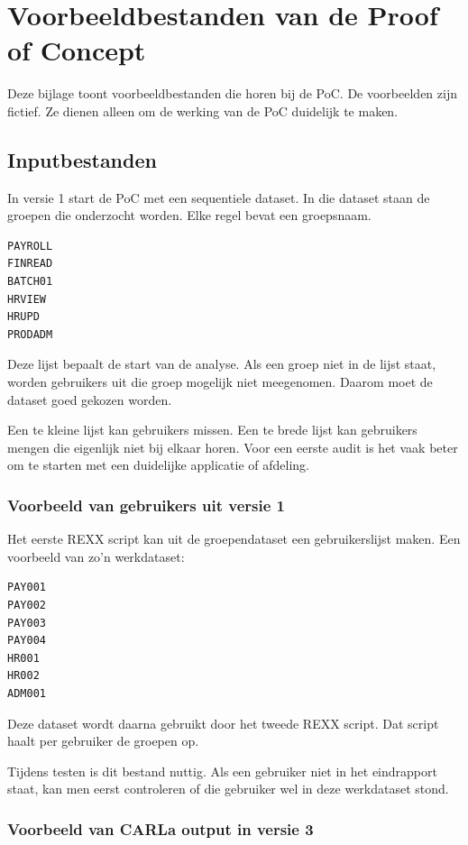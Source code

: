 \chapter[Voorbeeldbestanden]{Voorbeeldbestanden van de Proof of Concept}
\label{ch:bijlage-poc}

Deze bijlage toont voorbeeldbestanden die horen bij de PoC. De voorbeelden zijn fictief. Ze dienen alleen om de werking van de PoC duidelijk te maken.

\section{Inputbestanden}

In versie 1 start de PoC met een sequentiele dataset. In die dataset staan de groepen die onderzocht worden. Elke regel bevat een groepsnaam.

\begin{verbatim}
PAYROLL
FINREAD
BATCH01
HRVIEW
HRUPD
PRODADM
\end{verbatim}

Deze lijst bepaalt de start van de analyse. Als een groep niet in de lijst staat, worden gebruikers uit die groep mogelijk niet meegenomen. Daarom moet de dataset goed gekozen worden.

Een te kleine lijst kan gebruikers missen. Een te brede lijst kan gebruikers mengen die eigenlijk niet bij elkaar horen. Voor een eerste audit is het vaak beter om te starten met een duidelijke applicatie of afdeling.

\subsection*{Voorbeeld van gebruikers uit versie 1}

Het eerste REXX script kan uit de groependataset een gebruikerslijst maken. Een voorbeeld van zo'n werkdataset:

\begin{verbatim}
PAY001
PAY002
PAY003
PAY004
HR001
HR002
ADM001
\end{verbatim}

Deze dataset wordt daarna gebruikt door het tweede REXX script. Dat script haalt per gebruiker de groepen op.

Tijdens testen is dit bestand nuttig. Als een gebruiker niet in het eindrapport staat, kan men eerst controleren of die gebruiker wel in deze werkdataset stond.

\subsection*{Voorbeeld van CARLa output in versie 3}

